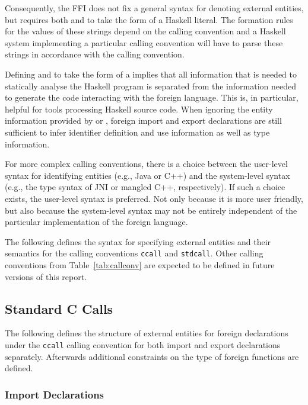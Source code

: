 \documentclass[a4paper,twoside]{article}
\newcommand{\code}[1]{\texttt{#1}}      %
\begin{document}
Consequently, the FFI does not fix a general syntax for denoting external
entities, but requires both  and  to take the
form of a Haskell  literal.  The formation rules for the values
of these strings depend on the calling convention and a Haskell system
implementing a particular calling convention will have to parse these strings
in accordance with the calling convention.

Defining  and  to take the form of a
 implies that all information that is needed to statically
analyse the Haskell program is separated from the information needed to
generate the code interacting with the foreign language.  This is, in
particular, helpful for tools processing Haskell source code.  When ignoring
the entity information provided by  or , foreign
import and export declarations are still sufficient to infer identifier
definition and use information as well as type information.

For more complex calling conventions, there is a choice between the user-level
syntax for identifying entities (e.g., Java or C{+}{+}) and the system-level
syntax (e.g., the type syntax of JNI or mangled C{+}{+}, respectively).  If
such a choice exists, the user-level syntax is preferred.  Not only because it
is more user friendly, but also because the system-level syntax may not be
entirely independent of the particular implementation of the foreign language.

The following defines the syntax for specifying external entities and their
semantics for the calling conventions \code{ccall} and \code{stdcall}.  Other
calling conventions from Table~\ref{tab:callconv} are expected to be defined
in future versions of this report.


\subsection{Standard C Calls}
\label{sec:ccall}

The following defines the structure of external entities for foreign
declarations under the \code{ccall} calling convention for both import and
export declarations separately.  Afterwards additional constraints on the type
of foreign functions are defined.

\subsubsection{Import Declarations}
\end{document}
